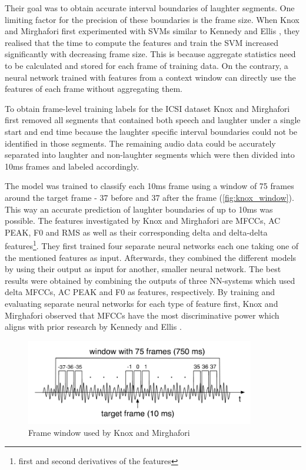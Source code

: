 \documentclass[bsc,frontabs,parskip,deptreport]{infthesis}
\begin{document}
Their goal was to obtain accurate interval boundaries of laughter segments.
One limiting factor for the precision of these boundaries is the frame size. 
When Knox and Mirghafori first experimented with SVMs similar to Kennedy and Ellis \citep{kennedy2004laughter}, they realised that the time to compute the features and train the SVM increased significantly with decreasing frame size. 
This is because aggregate statistics need to be calculated and stored for each frame of training data.  
On the contrary, a neural network trained with features from a context window can directly use the features of each frame without aggregating them.  

To obtain frame-level training labels for the ICSI dataset Knox and Mirghafori first removed all segments that contained both speech and laughter under a single start and end time because the laughter specific interval boundaries could not be identified in those segments. 
The remaining audio data could be accurately separated into laughter and non-laughter segments which were then divided into 10ms frames and labeled accordingly.

The model was trained to classify each 10ms frame using a window of 75 frames around the target frame - 37 before and 37 after the frame (\autoref{fig:knox_window}).
This way an accurate prediction of laughter boundaries of up to 10ms was possible. 
The features investigated by Knox and Mirghafori are MFCCs, AC PEAK, F0 and RMS as well as their corresponding delta and delta-delta features\footnote{first and second derivatives of the features}.
They first trained four separate neural networks each one taking one of the mentioned features as input.
Afterwards, they combined the different models by using their output as input for another, smaller neural network.
The best results were obtained by combining the outputs of three NN-systems which used delta MFCCs, AC PEAK and F0 as features, respectively.
By training and evaluating separate neural networks for each type of feature first, Knox and Mirghafori observed that MFCCs have the most discriminative power which aligns with prior research by Kennedy and Ellis \citep{kennedy2004laughter}.

\begin{figure}[htp]
    \centering
    \includegraphics[width=10cm]{imgs/Knox_window.png}
    \caption{Frame window used by Knox and Mirghafori}
    \label{fig:knox_window}
\end{figure}
\end{document}
